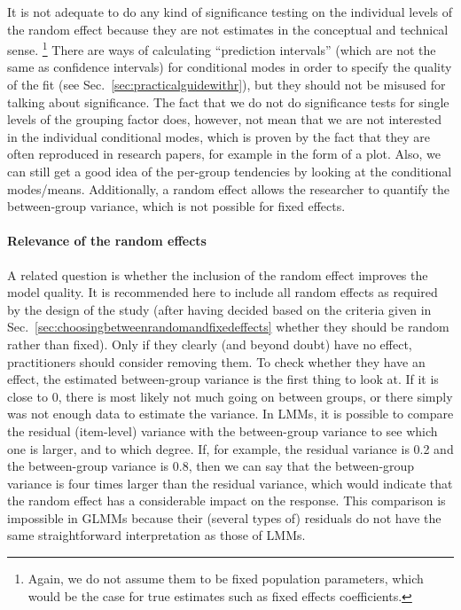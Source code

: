 It is not adequate to do any kind of significance testing on the individual levels of the random effect because they are not estimates in the conceptual and technical sense.%
\footnote{Again, we do not assume them to be fixed population parameters, which would be the case for true estimates such as fixed effects coefficients.}
There are ways of calculating ``prediction intervals'' (which are not the same as confidence intervals) for conditional modes in order to specify the quality of the fit (see Sec.~\ref{sec:practicalguidewithr}), but they should not be misused for talking about significance.
The fact that we do not do significance tests for single levels of the grouping factor does, however, not mean that we are not interested in the individual conditional modes, which is proven by the fact that they are often reproduced in research papers, for example in the form of a plot.
Also, we can still get a good idea of the per-group tendencies by looking at the conditional modes\slash means.
Additionally, a random effect allows the researcher to quantify the between-group variance, which is not possible for fixed effects.

\paragraph{Relevance of the random effects}

A related question is whether the inclusion of the random effect improves the model quality.
It is recommended here to include all random effects as required by the design of the study (after having decided based on the criteria given in Sec.~\ref{sec:choosingbetweenrandomandfixedeffects} whether they should be random rather than fixed).
Only if they clearly (and beyond doubt) have no effect, practitioners should consider removing them.
To check whether they have an effect, the estimated between-group variance is the first thing to look at.
If it is close to $0$, there is most likely not much going on between groups, or there simply was not enough data to estimate the variance.
In LMMs, it is possible to compare the residual (item-level) variance with the between-group variance to see which one is larger, and to which degree.
If, for example, the residual variance is 0.2 and the between-group variance is 0.8, then we can say that the between-group variance is four times larger than the residual variance, which would indicate that the random effect has a considerable impact on the response.
This comparison is impossible in GLMMs because their (several types of) residuals do not have the same straightforward interpretation as those of LMMs.

